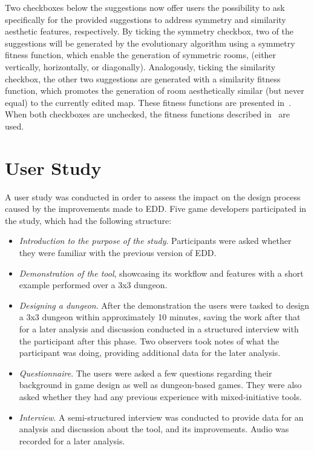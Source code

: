 \documentclass[sigconf]{acmart}
\begin{document}
Two checkboxes below the suggestions now offer users the possibility to ask specifically for the provided suggestions to address symmetry and similarity aesthetic features, respectively. By ticking the symmetry checkbox, two of the suggestions will be generated by the evolutionary algorithm using a symmetry fitness function, which enable the generation of symmetric rooms, (either vertically, horizontally, or diagonally). Analogously, ticking the similarity checkbox, the other two suggestions are generated with a similarity fitness function, which promotes the generation of room aesthetically similar (but never equal) to the currently edited map. These fitness functions are presented in~\cite{Eddy2_5}. When both checkboxes are unchecked, the fitness functions described in~\cite{Eddy2} are used.

\section{User Study} \label{userstudy} 



A user study was conducted in order to assess the impact on the design process caused by the improvements made to EDD. Five game developers participated in the study, which had the following structure:
\begin{itemize}
\item \textit{Introduction to the purpose of the study}. Participants were asked whether they were familiar with the previous version of EDD.
\item \textit{Demonstration of the tool}, showcasing its workflow and features with a short example performed over a 3x3 dungeon. 
\item \textit{Designing a dungeon}. After the demonstration the users were tasked to design a 3x3 dungeon within approximately 10 minutes, saving the work after that for a later analysis and discussion conducted in a structured interview with the participant after this phase. Two observers took notes of what the participant was doing, providing additional data for the later analysis.
\item \textit{Questionnaire}. The users were asked a few questions regarding their background in game design as well as dungeon-based games. They were also asked whether they had any previous experience with mixed-initiative tools.
\item \textit{Interview}. A semi-structured interview was conducted to provide data for an analysis and discussion about the tool, and its improvements. Audio was recorded for a later analysis.
\end{itemize}
\end{document}
